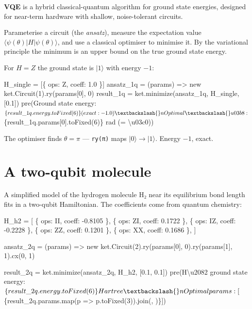 \documentclass[
  11pt,
  letterpaper,
  oneside]{scrbook}
\newenvironment{Shaded}{\begin{snugshade}}{\end{snugshade}}
\newcommand{\NormalTok}[1]{\textcolor[rgb]{0.00,0.23,0.31}{#1}}
\begin{document}
\textbf{VQE} is a hybrid classical-quantum algorithm for ground state
energies, designed for near-term hardware with shallow, noise-tolerant
circuits.

Parameterise a circuit (the \emph{ansatz}), measure the expectation
value \(\langle\psi(\theta)|H|\psi(\theta)\rangle\), and use a classical
optimiser to minimise it. By the variational principle the minimum is an
upper bound on the true ground state energy.

For \(H = Z\) the ground state is \(|1\rangle\) with energy \(-1\):

\begin{Shaded}
\begin{Highlighting}[]
\NormalTok{H\_single = [\{ ops: \textquotesingle{}Z\textquotesingle{}, coeff: 1.0 \}]}
\NormalTok{ansatz\_1q = (params) =\textgreater{} new ket.Circuit(1).ry(params[0], 0)}
\NormalTok{result\_1q = ket.minimize(ansatz\_1q, H\_single, [0.1])}
\NormalTok{pre(\textasciigrave{}Ground state energy: $\{result\_1q.energy.toFixed(6)\}   (exact: {-}1.0)\textbackslash{}nOptimal \textbackslash{}u03b8:           $\{result\_1q.params[0].toFixed(6)\} rad  (= \textbackslash{}u03c0)\textasciigrave{})}
\end{Highlighting}
\end{Shaded}

The optimiser finds \(\theta = \pi\) --- \texttt{ry(π)} maps
\(|0\rangle \to |1\rangle\). Energy \(-1\), exact.

\section{A two-qubit molecule}\label{a-two-qubit-molecule}

A simplified model of the hydrogen molecule H₂ near its equilibrium bond
length fits in a two-qubit Hamiltonian. The coefficients come from
quantum chemistry:

\begin{Shaded}
\begin{Highlighting}[]
\NormalTok{H\_h2 = [}
\NormalTok{  \{ ops: \textquotesingle{}II\textquotesingle{}, coeff: {-}0.8105 \},}
\NormalTok{  \{ ops: \textquotesingle{}ZI\textquotesingle{}, coeff:  0.1722 \},}
\NormalTok{  \{ ops: \textquotesingle{}IZ\textquotesingle{}, coeff: {-}0.2228 \},}
\NormalTok{  \{ ops: \textquotesingle{}ZZ\textquotesingle{}, coeff:  0.1201 \},}
\NormalTok{  \{ ops: \textquotesingle{}XX\textquotesingle{}, coeff:  0.1686 \},}
\NormalTok{]}

\NormalTok{ansatz\_2q = (params) =\textgreater{}}
\NormalTok{  new ket.Circuit(2).ry(params[0], 0).ry(params[1], 1).cx(0, 1)}

\NormalTok{result\_2q = ket.minimize(ansatz\_2q, H\_h2, [0.1, 0.1])}
\NormalTok{pre(\textasciigrave{}H\textbackslash{}u2082 ground state energy: $\{result\_2q.energy.toFixed(6)\} Hartree\textbackslash{}nOptimal params:         [$\{result\_2q.params.map(p =\textgreater{} p.toFixed(3)).join(\textquotesingle{}, \textquotesingle{})\}]\textasciigrave{})}
\end{Highlighting}
\end{Shaded}
\end{document}
